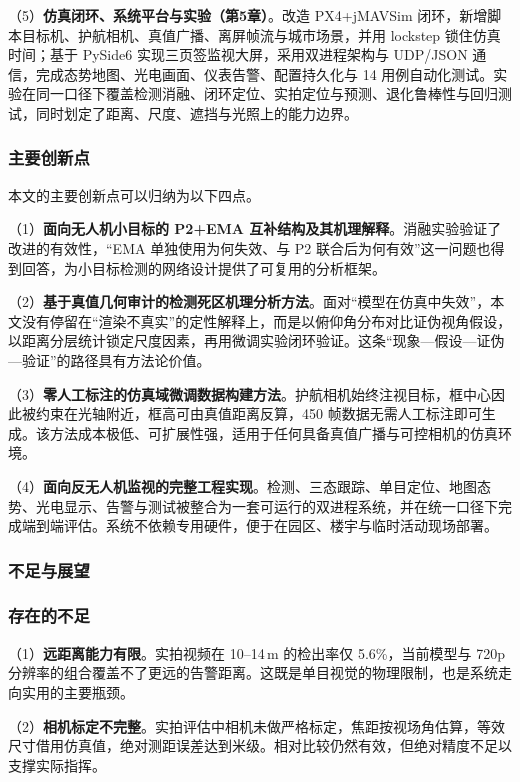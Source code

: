 （5）\textbf{仿真闭环、系统平台与实验（第5章）}。改造 PX4+jMAVSim 闭环，新增脚本目标机、护航相机、真值广播、离屏帧流与城市场景，并用 lockstep 锁住仿真时间；基于 PySide6 实现三页签监视大屏，采用双进程架构与 UDP/JSON 通信，完成态势地图、光电画面、仪表告警、配置持久化与 14 用例自动化测试。实验在同一口径下覆盖检测消融、闭环定位、实拍定位与预测、退化鲁棒性与回归测试，同时划定了距离、尺度、遮挡与光照上的能力边界。

\subsubsection{主要创新点}

本文的主要创新点可以归纳为以下四点。

（1）\textbf{面向无人机小目标的 P2+EMA 互补结构及其机理解释}。消融实验验证了改进的有效性，“EMA 单独使用为何失效、与 P2 联合后为何有效”这一问题也得到回答，为小目标检测的网络设计提供了可复用的分析框架。

（2）\textbf{基于真值几何审计的检测死区机理分析方法}。面对“模型在仿真中失效”，本文没有停留在“渲染不真实”的定性解释上，而是以俯仰角分布对比证伪视角假设，以距离分层统计锁定尺度因素，再用微调实验闭环验证。这条“现象—假设—证伪—验证”的路径具有方法论价值。

（3）\textbf{零人工标注的仿真域微调数据构建方法}。护航相机始终注视目标，框中心因此被约束在光轴附近，框高可由真值距离反算，450 帧数据无需人工标注即可生成。该方法成本极低、可扩展性强，适用于任何具备真值广播与可控相机的仿真环境。

（4）\textbf{面向反无人机监视的完整工程实现}。检测、三态跟踪、单目定位、地图态势、光电显示、告警与测试被整合为一套可运行的双进程系统，并在统一口径下完成端到端评估。系统不依赖专用硬件，便于在园区、楼宇与临时活动现场部署。

\subsubsection{不足与展望}

\subsubsection{存在的不足}

（1）\textbf{远距离能力有限}。实拍视频在 10--14\,m 的检出率仅 5.6\%，当前模型与 720p 分辨率的组合覆盖不了更远的告警距离。这既是单目视觉的物理限制，也是系统走向实用的主要瓶颈。

（2）\textbf{相机标定不完整}。实拍评估中相机未做严格标定，焦距按视场角估算，等效尺寸借用仿真值，绝对测距误差达到米级。相对比较仍然有效，但绝对精度不足以支撑实际指挥。

